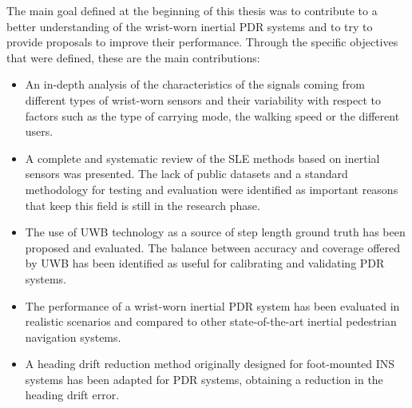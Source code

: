 The main goal defined at the beginning of this thesis was to contribute to a better understanding of the wrist-worn inertial PDR systems and to try to provide proposals to improve their performance. 
Through the specific objectives that were defined, these are the main contributions:
\begin{itemize}
	\item An in-depth analysis of the characteristics of the signals coming from different types of wrist-worn sensors and their variability with respect to factors such as the type of carrying mode, the walking speed or the different users.
	\item A complete and systematic review of the SLE methods based on inertial sensors was presented. The lack of public datasets and a standard methodology for testing and evaluation were identified as important reasons that keep this field is still in the research phase.
	\item The use of UWB technology as a source of step length ground truth has been proposed and evaluated. The balance between accuracy and coverage offered by UWB has been identified as useful for calibrating and validating PDR systems.
	\item The performance of a wrist-worn inertial PDR system has been evaluated in realistic scenarios and compared to other state-of-the-art inertial pedestrian navigation systems.
	\item A heading drift reduction method originally designed for foot-mounted INS systems has been adapted for PDR systems, obtaining a reduction in the heading drift error.
\end{itemize}


